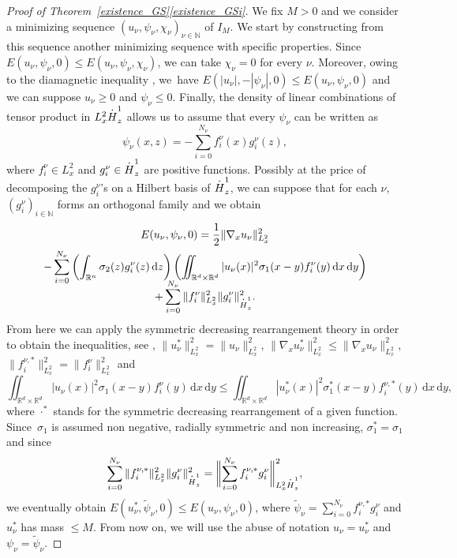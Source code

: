 \documentclass[11pt]{article}
\DeclareRobustCommand{\accentset}[2]{\overset{#1}{#2}}
\theoremstyle{definition}
\newcommand*{\overbigdot}[1]{%
\accentset{\mbox{\large\bfseries .}}{#1}}
\newenvironment{ProofOf}[1]{\begin{proof}[Proof of #1]}{\end{proof}}
\newcommand{\R}{\mathbb{R}}
\newcommand{\ud}{\, {\mathrm{d}}}
\begin{document}
\begin{ProofOf}{Theorem~\ref{existence_GS}\eqref{existence_GSi}}
We fix $M>0$ and we consider a minimizing sequence $(u_{\nu},\psi_{\nu},\chi_{\nu})_{\nu\in\mathbb N}$ of $I_{M}$. We start by constructing from this sequence another minimizing sequence with specific properties. Since $E(u_{\nu},\psi_{\nu},0)\leq E(u_{\nu},\psi_{\nu},\chi_{\nu})$, we can take $\chi_{\nu}=0$ for every $\nu$. Moreover, owing to
the diamagnetic inequality \cite[Th.\,7.21]{LL}, we~have
$E(|u_{\nu}|,-|\psi_{\nu}|,0)\leq E(u_{\nu},\psi_{\nu},0)$ and we can suppose $u_{\nu}\geq 0$ and $\psi_{\nu}\leq 0$. Finally, the density of linear combinations of tensor product in $L_{x}^{2}\overbigdot{H}_{z}^{1}$ allows us to assume that every $\psi_{\nu}$ can be written as\vspace*{-3pt}
\[
\psi_{\nu}(x,z)=-\sum\limits_{i=0}^{N_{\nu}}f_{i}^{\nu}(x)g_{i}^{\nu}(z),
\]
where $f_{i}^{\nu}\in L_{x}^{2}$ and $g_{i}^{\nu}\in\overbigdot{H}_{z}^{1}$ are positive functions.
Possibly at the price of decomposing the
$g_{i}^{\nu}$'s on a Hilbert basis of $\overbigdot{H}_{z}^{1}$, we can suppose that for each $\nu$, $(g_{i}^{\nu})_{i\in \mathbb N}$ forms an orthogonal family and we obtain\vspace*{-8pt}
\begin{multline*}
E(u_{\nu},\psi_{\nu},0)=\frac{1}{2}\|\nabla_{x}u_{\nu}\|_{L_{x}^{2}}^{2}\\
-\sum\limits_{i=0}^{N_{\nu}}\left(\int_{\R^{n}}\sigma_{2}(z)g_{i}^{\nu}(z)\ud z\right)\left(\iint_{\R^{d}\times\R^{d}}|u_{\nu}(x)|^{2}\sigma_{1}(x-y)f_{i}^{\nu}(y)\ud x\ud y\right)\\[
-8pt]
+\sum\limits_{i=0}^{N_{\nu}}\|f_{i}^{\nu}\|_{L_{x}^{2}}^{2}\|g_{i}^{\nu}\|_{\overbigdot{H}_{z}^{1}}^{2}.
\end{multline*}
From here we can apply the symmetric decreasing rearrangement theory in order to obtain the inequalities, see \cite[Chap.\,3]{LL}, $\|u_{\nu}^{*}\|_{L_{x}^{2}}^{2}=\|u_{\nu}\|_{L_{x}^{2}}^{2}$,
$\|\nabla_{x}u_{\nu}^{*}\|_{L_{x}^{2}}^{2}\leq\|\nabla_{x}u_{\nu}\|_{L_{x}^{2}}^{2}$, $\|f_{i}^{\nu,*}\|_{L_{x}^{2}}^{2}=\|f_{i}^{\nu}\|_{L_{x}^{2}}^{2}$ and\vspace*{-3pt}
\[
\iint_{\R^{d}\times\R^{d}}|u_{\nu}(x)|^{2}\sigma_{1}(x-y)f_{i}^{\nu}(y)\ud x\ud y\leq \iint_{\R^{d}\times\R^{d}}|u_{\nu}^{*}(x)|^{2}\sigma_{1}^{*}(x-y)f_{i}^{\nu,*}(y)\ud x\ud y,
\]
where $\cdot^{*}$ stands for the symmetric decreasing rearrangement of a given function. Since~$\sigma_{1}$ is assumed non negative, radially symmetric and non increasing, $\sigma_{1}^{*}=\sigma_{1}$ and since\vspace*{-5pt}
\[
\sum\limits_{i=0}^{N_{\nu}}\|f_{i}^{\nu,*}\|_{L_{x}^{2}}^{2}\|g_{i}^{\nu}\|_{\overbigdot{H}_{z}^{1}}^{2}=\biggl\|\sum\limits_{i=0}^{N_{\nu}}f_{i}^{\nu,*}g_{i}^{\nu}\biggr\|_{L_{x}^{2}\overbigdot{H}_{z}^{1}}^{2},
\]
we eventually obtain $E(u_{\nu}^{*},\widetilde{\psi}_{\nu},0)\leq E(u_{\nu},\psi_{\nu},0)$,
where $\widetilde{\psi}_{\nu}=\sum_{i=0}^{N_{\nu}}f_{i}^{\nu,*}g_{i}^{\nu}$
and $u_{\nu}^{*}$ has mass $\leq M$. From now on, we will use the abuse of notation $u_{\nu}=u_{\nu}^{*}$ and $\psi_{\nu}=\widetilde{\psi}_{\nu}$.


\end{ProofOf}
\end{document}
